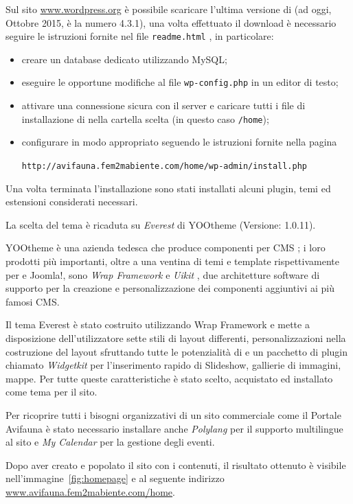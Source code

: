 Sul sito \url{www.wordpress.org} è possibile scaricare l'ultima versione di {\wp} (ad oggi, Ottobre 2015, è la numero 4.3.1), una volta effettuato il download è necessario seguire le istruzioni fornite nel file \texttt{readme.html} \cite{installing_wordpress}, in particolare:
\begin{itemize}
 \item creare un database dedicato utilizzando MySQL;
 \item eseguire le opportune modifiche al file \texttt{wp-config.php} in un editor di testo;
 \item attivare una connessione sicura con il server e caricare tutti i file di installazione di {\wp} nella cartella scelta (in questo caso \texttt{/home});
 \item configurare in modo appropriato seguendo le istruzioni fornite nella pagina

 \texttt{http://avifauna.fem2mabiente.com/home/wp-admin/install.php}
\end{itemize}

Una volta terminata l'installazione sono stati installati alcuni plugin, temi ed estensioni considerati necessari.

La scelta del tema è ricaduta su \emph{Everest} di YOOtheme (Versione: 1.0.11). 

YOOtheme è una azienda tedesca che produce componenti per CMS \cite{yootheme}; i loro prodotti più importanti, oltre a una ventina di temi e template rispettivamente per {\wp} e Joomla!, sono \emph{Wrap Framework} \cite{wrap} e \emph{Uikit} \cite{uikit}, due architetture software di supporto per la creazione e personalizzazione dei componenti aggiuntivi ai più famosi CMS.

Il tema Everest è stato costruito utilizzando Wrap Framework e mette a disposizione dell'utilizzatore sette stili di layout differenti, personalizzazioni nella costruzione del layout sfruttando tutte le potenzialità di {\wp} e un pacchetto di plugin chiamato \emph{Widgetkit} per l'inserimento rapido di Slideshow, gallierie di immagini, mappe. Per tutte queste caratteristiche è stato scelto, acquistato ed installato come tema per il sito.

Per ricoprire tutti i bisogni organizzativi di un sito commerciale come il Portale Avifauna è stato necessario installare anche \emph{Polylang} \cite{polylang} per il supporto multilingue al sito e \emph{My Calendar} \cite{mycalendar} per la gestione degli eventi.

Dopo aver creato e popolato il sito con i contenuti, il risultato ottenuto è visibile nell'immagine~\ref{fig:homepage} e al seguente indirizzo \url{www.avifauna.fem2mabiente.com/home}.

